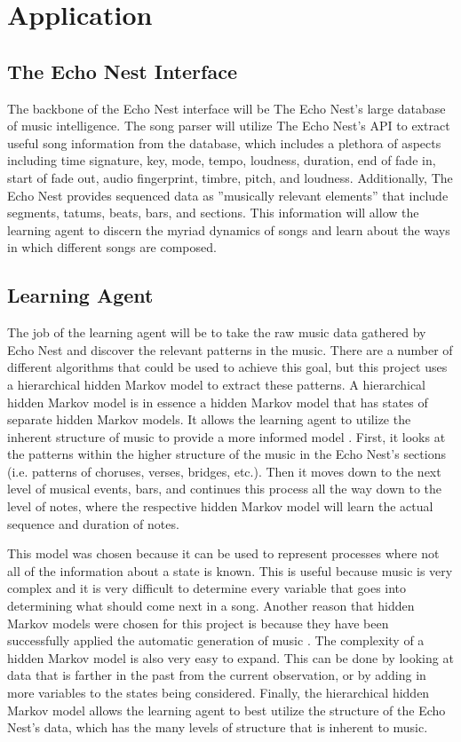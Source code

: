 \documentclass{article}
\begin{document}
\section{Application}
\subsection{The Echo Nest Interface}
The backbone of the Echo Nest interface will be The Echo Nest’s large database of music intelligence. The
song parser will utilize The Echo Nest’s API to extract useful song information from the database, which
includes a plethora of aspects including time signature, key, mode, tempo, loudness, duration, end of fade
in, start of fade out, audio fingerprint, timbre, pitch, and loudness. Additionally, The Echo Nest provides
sequenced data as ”musically relevant elements” that include segments, tatums, beats, bars, and sections.
This information will allow the learning agent to discern the myriad dynamics of songs and learn about the
ways in which different songs are composed.

\subsection{Learning Agent}
The job of the learning agent will be to take the raw music data gathered by Echo Nest and discover the
relevant patterns in the music. There are a number of different algorithms that could be used to achieve this
goal, but this project uses a hierarchical hidden Markov model to extract these patterns. A hierarchical 
hidden Markov model is in essence a hidden Markov model that has states of separate hidden Markov models.
It allows the learning agent to utilize the inherent structure of music to provide a more informed model 
\cite{SOMETHING}. First, it looks at the patterns within the higher structure of the music in the Echo 
Nest's sections (i.e. patterns of choruses, verses, bridges, etc.). Then it moves down to the next level of 
musical events, bars, and continues this process all the way down to the level of notes, where the 
respective hidden Markov model will learn the actual sequence and duration of notes.

This model was chosen because it can be used to represent processes where not all of the information about 
a state is known. This is useful because music is very complex and it is very difficult to determine every
variable that goes into determining what should come next in a song. Another reason that hidden Markov 
models were chosen for this project is because they have been successfully applied the automatic generation
of music \cite{5492670}. The complexity of a hidden Markov model is also very easy to expand. This can be 
done by looking at data that is farther in the past from the current observation, or by adding in more
variables to the states being considered. Finally, the hierarchical hidden Markov model allows the learning
agent to best utilize the structure of the Echo Nest's data, which has the many levels of structure that is
inherent to music.
\end{document}

